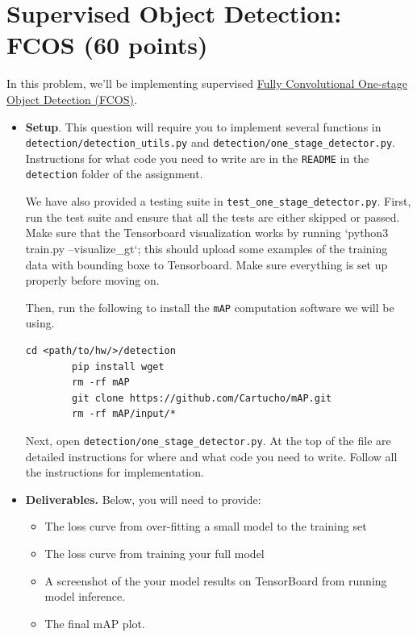 \documentclass[11pt,addpoints,answers]{exam}
\numberwithin{equation}{section} %
\numberwithin{figure}{section} %
\numberwithin{table}{section} %
\begin{document}
\clearpage
\section{Supervised Object Detection: FCOS (60 points)}
In this problem, we'll be implementing supervised {\href{https://arxiv.org/abs/1904.01355}{Fully Convolutional One-stage Object Detection (FCOS)}}. 

\begin{itemize}
    \item \textbf{Setup}. This question will require you to implement several functions in \texttt{detection/detection\_utils.py} and \texttt{detection/one\_stage\_detector.py}. Instructions for what code you need to write are in the \texttt{README} in the \texttt{detection} folder of the assignment.
    
    We have also provided a testing suite in \texttt{test\_one\_stage\_detector.py}. First, run the test suite
    and ensure that all the tests are either skipped or passed. Make sure that the Tensorboard visualization works by running `python3 train.py --visualize\_gt`; this should upload some examples of the training data with bounding boxe to Tensorboard. Make sure everything is set up properly before moving on.

    Then, run the following to install the \texttt{mAP} computation software we will be using.
    \begin{lstlisting}[language=Shell]
        cd <path/to/hw/>/detection
        pip install wget  
        rm -rf mAP
        git clone https://github.com/Cartucho/mAP.git
        rm -rf mAP/input/*
    \end{lstlisting}

    Next, open \texttt{detection/one\_stage\_detector.py}. At the top of the file are detailed
    instructions for where and what code you need to write. Follow all the instructions for implementation. 

    \item \textbf{Deliverables.} Below, you will need to provide:
    \begin{itemize}
        \item The loss curve from over-fitting a small model to the training set
        \item The loss curve from training your full model
        \item A screenshot of the your model results on TensorBoard from running model inference.
        \item The final mAP plot.
    \end{itemize}
\end{itemize}
\end{document}
